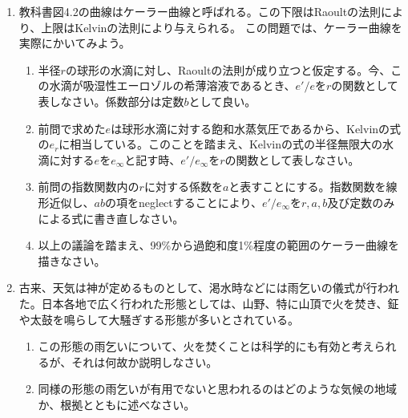 \documentclass{jsarticle}
\newenvironment{problems}
{
  \renewcommand\labelenumi{\doublebox{\arabic{enumi}}}
  \begin{enumerate}
}{
  \end{enumerate}
  \renewcommand\labelenumi{\arabic{enumi}.}
}
\begin{document}
\begin{problems}
    \item 教科書図4.2の曲線はケーラー曲線と呼ばれる。この下限はRaoultの法則により、上限はKelvinの法則により与えられる。
        この問題では、ケーラー曲線を実際にかいてみよう。
        \begin{enumerate}[(1)]
        \item 半径$r$の球形の水滴に対し、Raoultの法則が成り立つと仮定する。今、この水滴が吸湿性エーロゾルの希薄溶液であるとき、$e'/e$を$r$の関数として表しなさい。係数部分は定数$b$として良い。
        \item 前問で求めた$e$は球形水滴に対する飽和水蒸気圧であるから、Kelvinの式の$e_r$に相当している。このことを踏まえ、Kelvinの式の半径無限大の水滴に対する$e$を$e_\infty$と記す時、$e'/e_\infty$を$r$の関数として表しなさい。
        \item 前問の指数関数内の$r$に対する係数を$a$と表すことにする。指数関数を線形近似し、$ab$の項をneglectすることにより、$e'/e_\infty$を$r,a,b$及び定数のみによる式に書き直しなさい。
        \item 以上の議論を踏まえ、99\%から過飽和度1\%程度の範囲のケーラー曲線を描きなさい。\\
        \end{enumerate}

    \item 古来、天気は神が定めるものとして、渇水時などには雨乞いの儀式が行われた。日本各地で広く行われた形態としては、山野、特に山頂で火を焚き、鉦や太鼓を鳴らして大騒ぎする形態が多いとされている。
        \begin{enumerate}[(1)]
        \item この形態の雨乞いについて、火を焚くことは科学的にも有効と考えられるが、それは何故か説明しなさい。
        \item 同様の形態の雨乞いが有用でないと思われるのはどのような気候の地域か、根拠とともに述べなさい。
        \end{enumerate}

\end{problems}
\end{document}
